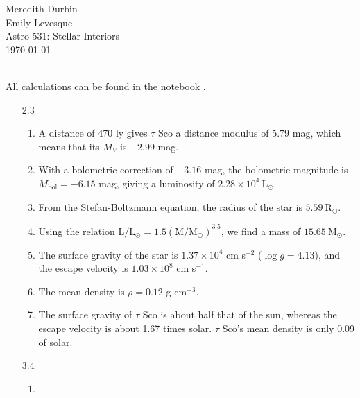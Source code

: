 \documentclass[11pt]{article}
\newcommand\lsol{\mathrm{L}_\odot}
\newcommand\rsol{\mathrm{R}_\odot}
\newcommand\msol{\mathrm{M}_\odot}
\begin{document}
\begin{flushright}Meredith Durbin\\
Emily Levesque\\
Astro 531: Stellar Interiors\\
\today\\

\end{flushright}

 \\[6pt]

All calculations can be found in the notebook \url{}.


\begin{enumerate}

\item [2.3]
	\begin{enumerate}
	
    \item A distance of 470 ly gives $\tau$ Sco a distance modulus of 5.79 mag, which means that its $M_V$ is $-2.99$ mag.
    
    \item With a bolometric correction of $-3.16$ mag, the bolometric magnitude is $M_\mathrm{bol} = -6.15$ mag, giving a luminosity of $2.28 \times 10^4~\lsol$.
    
    \item From the Stefan-Boltzmann equation, the radius of the star is $5.59~\rsol$.

    \item Using the relation $\mathrm{L}/\lsol = 1.5(\mathrm{M}/\msol)^{3.5}$, we find a mass of $15.65~\msol$.
    
    \item The surface gravity of the star is $1.37 \times 10^4$ cm s$^{-2}$ ($\log g = 4.13$), and the escape velocity is $1.03 \times 10^8$ cm s$^{-1}$.
    
    \item The mean density is $\rho = 0.12$ g cm$^{-3}$.
    
    \item The surface gravity of $\tau$ Sco is about half that of the sun, whereas the escape velocity is about 1.67 times solar. $\tau$ Sco's mean density is only 0.09 of solar.
    
    \end{enumerate}

\item [3.4]
	\begin{enumerate}
    \item 
    \end{enumerate}


\end{enumerate}
\end{document}

